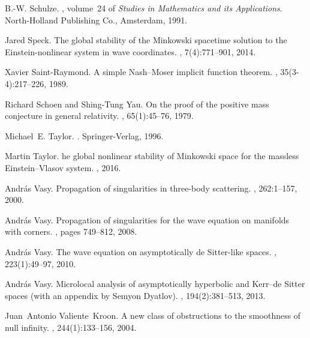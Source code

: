 \documentclass[reqno,11pt,letterpaper]{amsart}
\numberwithin{equation}{section}
\numberwithin{figure}{section}
\theoremstyle{definition}
\theoremstyle{remark}
\begin{document}
\begin{thebibliography}{GCHMG05}
B.-W. Schulze.
,
  volume~24 of {\em Studies in Mathematics and its Applications}.
\newblock North-Holland Publishing Co., Amsterdam, 1991.

Jared Speck.
\newblock The global stability of the {M}inkowski spacetime solution to the
  {E}instein-nonlinear system in wave coordinates.
, 7(4):771--901, 2014.

Xavier Saint-Raymond.
\newblock A simple {N}ash--{M}oser implicit function theorem.
, 35(3-4):217--226, 1989.

Richard Schoen and Shing-Tung Yau.
\newblock On the proof of the positive mass conjecture in general relativity.
, 65(1):45--76, 1979.

Michael~E. Taylor.
.
\newblock Springer-Verlag, 1996.

Martin Taylor.
he global nonlinear stability of {M}inkowski space for the
  massless {E}instein--{V}lasov system.
, 2016.

Andr{\'a}s Vasy.
\newblock Propagation of singularities in three-body scattering.
, 262:1--157, 2000.

Andr{\'a}s Vasy.
\newblock Propagation of singularities for the wave equation on manifolds with
  corners.
, pages 749--812, 2008.

Andr{\'a}s Vasy.
\newblock The wave equation on asymptotically de {S}itter-like spaces.
, 223(1):49--97, 2010.

Andr{\'a}s Vasy.
\newblock Microlocal analysis of asymptotically hyperbolic and {K}err--de
  {S}itter spaces (with an appendix by {S}emyon {D}yatlov).
, 194(2):381--513, 2013.

Juan~Antonio Valiente~Kroon.
\newblock A new class of obstructions to the smoothness of null infinity.
, 244(1):133--156, 2004.


\end{thebibliography}
\end{document}
